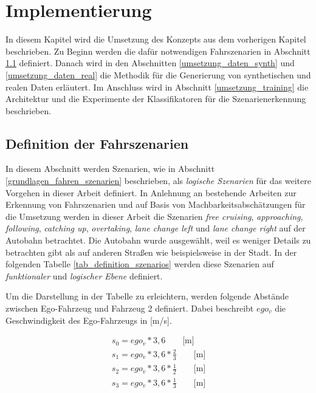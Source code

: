 
\chapter{Implementierung}
\label{umsetzung}

In diesem Kapitel wird die Umsetzung des Konzepts aus dem vorherigen Kapitel beschrieben. Zu Beginn werden die dafür notwendigen Fahrszenarien in Abschnitt \ref{umsetzung_definition} definiert. Danach wird in den Abschnitten \ref{umsetzung_daten_synth} und \ref{umsetzung_daten_real} die Methodik für die Generierung von synthetischen und realen Daten erläutert. Im Anschluss wird in Abschnitt \ref{umsetzung_training} die Architektur und die Experimente der Klassifikatoren für die Szenarienerkennung beschrieben.


\section{Definition der Fahrszenarien}
\label{umsetzung_definition}

In diesem Abschnitt werden Szenarien, wie in Abschnitt \ref{grundlagen_fahren_szenarien} beschrieben, als \textit{logische Szenarien} für das weitere Vorgehen in dieser Arbeit definiert. In Anlehnung an bestehende Arbeiten zur Erkennung von Fahrszenarien und auf Basis von Machbarkeitsabschätzungen für die Umsetzung werden in dieser Arbeit die Szenarien \textit{free cruising}, \textit{approaching}, \textit{following}, \textit{catching up}, \textit{overtaking}, \textit{lane change left} und \textit{lane change right} auf der Autobahn betrachtet. Die Autobahn wurde ausgewählt, weil es weniger Details zu betrachten gibt als auf anderen Straßen wie beispielsweise in der Stadt. In der folgenden Tabelle \ref{tab_definition_szenarios} werden diese Szenarien auf \textit{funktionaler} und \textit{logischer Ebene} definiert.

Um die Darstellung in der Tabelle zu erleichtern, werden folgende Abstände zwischen Ego-Fahrzeug und Fahrzeug 2 definiert. Dabei beschreibt $ego_v$ die Geschwindigkeit des Ego-Fahrzeugs in [m/s].

\begin{equation*}
\begin{split}
s_0 = ego_v * 3,6 \qquad \text{[m]} \\
s_1 = ego_v * 3,6 * \frac{2}{3} \qquad \text{[m]} \\
s_2 = ego_v * 3,6 * \frac{1}{2} \qquad \text{[m]} \\
s_3 = ego_v * 3,6 * \frac{1}{3} \qquad \text{[m]} \\
\end{split}
\end{equation*}

